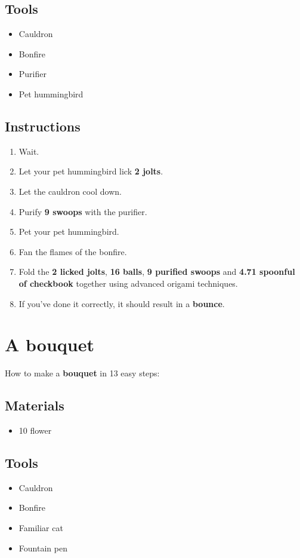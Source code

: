 \documentclass{article}
\begin{document}
\subsection{Tools}\begin{itemize}
\item 
Cauldron
\item 
Bonfire
\item 
Purifier
\item 
Pet hummingbird
\end{itemize}
\subsection{Instructions}\begin{enumerate}
\item 
Wait.
\item 
Let your pet hummingbird lick \textbf{2 jolts}.
\item 
Let the cauldron cool down.
\item 
Purify \textbf{9 swoops} with the purifier.
\item 
Pet your pet hummingbird.
\item 
Fan the flames of the bonfire.
\item 
Fold the \textbf{2 licked jolts}, \textbf{16 balls}, \textbf{9 purified swoops} and \textbf{4.71 spoonful of checkbook} together using advanced origami techniques.
\item 
If you've done it correctly, it should result in a \textbf{bounce}.
\end{enumerate}
\newpage
\section{A bouquet}How to make a \textbf{bouquet} in 13 easy steps:

\subsection{Materials}\begin{itemize}
\item 
10 flower
\end{itemize}
\subsection{Tools}\begin{itemize}
\item 
Cauldron
\item 
Bonfire
\item 
Familiar cat
\item 
Fountain pen
\end{itemize}
\end{document}
